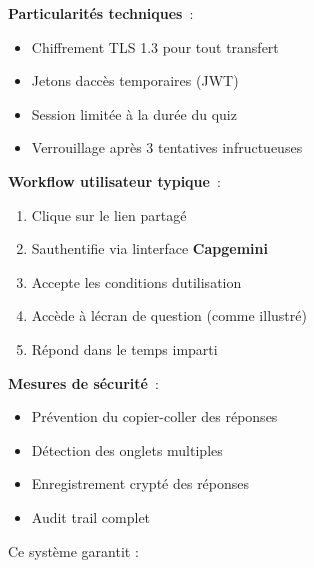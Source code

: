 \documentclass[12pt,a4paper,twoside]{report}
\begin{document}
\textbf{Particularités techniques}~:

\begin{itemize}
\item
  Chiffrement TLS 1.3 pour tout transfert
\item
  Jetons d\textquotesingle accès temporaires (JWT)
\item
  Session limitée à la durée du quiz
\item
  Verrouillage après 3 tentatives infructueuses
\end{itemize}

\textbf{Workflow utilisateur typique}~:

\begin{enumerate}
\def\labelenumi{\arabic{enumi}.}
\item
  Clique sur le lien partagé
\item
  S\textquotesingle authentifie via l\textquotesingle interface
  \textbf{Capgemini}
\item
  Accepte les conditions d\textquotesingle utilisation
\item
  Accède à l\textquotesingle écran de question (comme illustré)
\item
  Répond dans le temps imparti
\end{enumerate}

\textbf{Mesures de sécurité}~:

\begin{itemize}
\item
  Prévention du copier-coller des réponses
\item
  Détection des onglets multiples
\item
  Enregistrement crypté des réponses
\item
  Audit trail complet
\end{itemize}

Ce système garantit :
\end{document}
